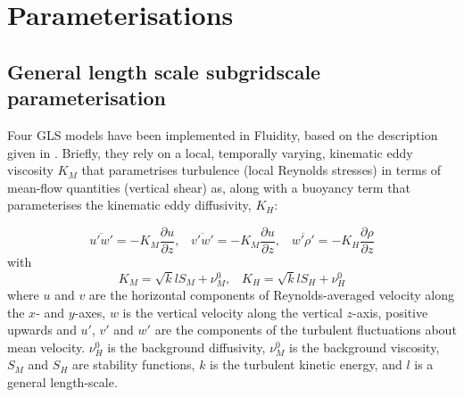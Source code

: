 \chapter{Parameterisations}\label{chap:parameterisations}

\section{General length scale subgridscale parameterisation}\label{Sec:GLS}

Four GLS models have been implemented in Fluidity, based on the description given in \citet{warner2005}.
Briefly, they rely on a local, temporally varying, kinematic eddy viscosity $K_M$ that parametrises 
turbulence (local Reynolds stresses) in terms of mean-flow quantities (vertical shear) as, along 
with a buoyancy term that parameterises the kinematic eddy diffusivity, $K_H$:

\begin{equation}
\overline{u'w'} = -K_M\frac{\partial u}{\partial z},\;\;\;
\overline{v'w'} = -K_M\frac{\partial u}{\partial z},\;\;\;
\overline{w'\rho'} = -K_H\frac{\partial\rho}{\partial z}
\end{equation} 
with
\begin{equation}
K_M = \sqrt{k}lS_M+\nu_M^0, \;\;\;
K_H = \sqrt{k}lS_H+\nu_H^0
\label{eq:diff}
\end{equation}
where $u$ and $v$ are the horizontal components of Reynolds-averaged velocity along the $x$- and $y$-axes, $w$ is 
the vertical velocity along the vertical $z$-axis, positive upwards and $u'$, $v'$ and $w'$ are the components 
of the turbulent fluctuations about mean velocity. $\nu_H^0$ is the background diffusivity, $\nu_M^0$ 
is the background viscosity, $S_M$ and $S_H$ are stability functions, 
$k$ is the turbulent kinetic energy, and $l$ is a general length-scale.

